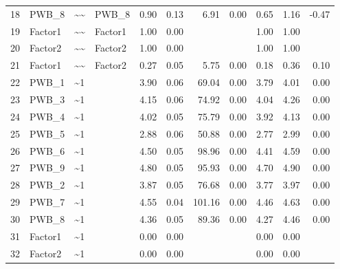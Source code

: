 \documentclass{article}
\begin{document}
\begin{table}[ht]
\begin{tabular}{rlllrrrrrrr}
  18 & PWB\_8 & \~{}\~{} & PWB\_8 & 0.90 & 0.13 & 6.91 & 0.00 & 0.65 & 1.16 & -0.47 \\ 
  19 & Factor1 & \~{}\~{} & Factor1 & 1.00 & 0.00 &  &  & 1.00 & 1.00 &  \\ 
  20 & Factor2 & \~{}\~{} & Factor2 & 1.00 & 0.00 &  &  & 1.00 & 1.00 &  \\ 
  21 & Factor1 & \~{}\~{} & Factor2 & 0.27 & 0.05 & 5.75 & 0.00 & 0.18 & 0.36 & 0.10 \\ 
  22 & PWB\_1 & \~{}1 &  & 3.90 & 0.06 & 69.04 & 0.00 & 3.79 & 4.01 & 0.00 \\ 
  23 & PWB\_3 & \~{}1 &  & 4.15 & 0.06 & 74.92 & 0.00 & 4.04 & 4.26 & 0.00 \\ 
  24 & PWB\_4 & \~{}1 &  & 4.02 & 0.05 & 75.79 & 0.00 & 3.92 & 4.13 & 0.00 \\ 
  25 & PWB\_5 & \~{}1 &  & 2.88 & 0.06 & 50.88 & 0.00 & 2.77 & 2.99 & 0.00 \\ 
  26 & PWB\_6 & \~{}1 &  & 4.50 & 0.05 & 98.96 & 0.00 & 4.41 & 4.59 & 0.00 \\ 
  27 & PWB\_9 & \~{}1 &  & 4.80 & 0.05 & 95.93 & 0.00 & 4.70 & 4.90 & 0.00 \\ 
  28 & PWB\_2 & \~{}1 &  & 3.87 & 0.05 & 76.68 & 0.00 & 3.77 & 3.97 & 0.00 \\ 
  29 & PWB\_7 & \~{}1 &  & 4.55 & 0.04 & 101.16 & 0.00 & 4.46 & 4.63 & 0.00 \\ 
  30 & PWB\_8 & \~{}1 &  & 4.36 & 0.05 & 89.36 & 0.00 & 4.27 & 4.46 & 0.00 \\ 
  31 & Factor1 & \~{}1 &  & 0.00 & 0.00 &  &  & 0.00 & 0.00 &  \\ 
  32 & Factor2 & \~{}1 &  & 0.00 & 0.00 &  &  & 0.00 & 0.00 &  \\ 
   \hline
\end{tabular}
\end{table}
\end{document}
